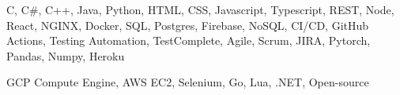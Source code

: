 \documentclass[11pts]{article}
\begin{document}
\bigskip


\smallskip

C, C\#, C++, Java, Python, HTML, CSS, Javascript, Typescript, REST, Node, React, NGINX, Docker,
SQL, Postgres, Firebase, NoSQL, CI/CD, GitHub Actions, Testing Automation, TestComplete, Agile, Scrum, JIRA,
Pytorch, Pandas, Numpy, Heroku
\smallskip

GCP Compute Engine, AWS EC2, Selenium, Go, Lua, .NET, Open-source
\end{document}
